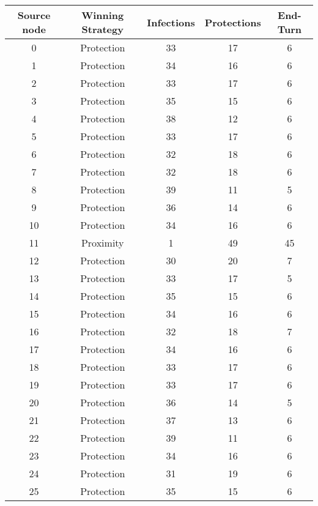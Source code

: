 \documentclass[results.tex]{subfiles}
\begin{document}
\begin{center}
  \begin{tabular}{| c || c | c | c | c |}
    \hline
    {\bfseries Source node} & {\bfseries Winning Strategy} & {\bfseries Infections} & {\bfseries Protections} & {\bfseries End-Turn} \\  %
    \hline\hline
    0 & Protection & 33 & 17 & 6 \\ 
    \hline
    1 & Protection & 34 & 16 & 6 \\ 
    \hline
    2 & Protection & 33 & 17 & 6 \\ 
    \hline
    3 & Protection & 35 & 15 & 6 \\ 
    \hline
    4 & Protection & 38 & 12 & 6 \\ 
    \hline
    5 & Protection & 33 & 17 & 6 \\ 
    \hline
    6 & Protection & 32 & 18 & 6 \\ 
    \hline
    7 & Protection & 32 & 18 & 6 \\ 
    \hline
    8 & Protection & 39 & 11 & 5 \\ 
    \hline
    9 & Protection & 36 & 14 & 6 \\ 
    \hline
    10 & Protection & 34 & 16 & 6 \\ 
    \hline
    11 & Proximity & 1 & 49 & 45 \\ 
    \hline
    12 & Protection & 30 & 20 & 7 \\ 
    \hline
    13 & Protection & 33 & 17 & 5 \\ 
    \hline
    14 & Protection & 35 & 15 & 6 \\ 
    \hline
    15 & Protection & 34 & 16 & 6 \\ 
    \hline
    16 & Protection & 32 & 18 & 7 \\ 
    \hline
    17 & Protection & 34 & 16 & 6 \\ 
    \hline
    18 & Protection & 33 & 17 & 6 \\ 
    \hline
    19 & Protection & 33 & 17 & 6 \\ 
    \hline
    20 & Protection & 36 & 14 & 5 \\ 
    \hline
    21 & Protection & 37 & 13 & 6 \\ 
    \hline
    22 & Protection & 39 & 11 & 6 \\ 
    \hline
    23 & Protection & 34 & 16 & 6 \\ 
    \hline
    24 & Protection & 31 & 19 & 6 \\ 
    \hline
    25 & Protection & 35 & 15 & 6 \\ 

\end{tabular}
\end{center}
\end{document}
